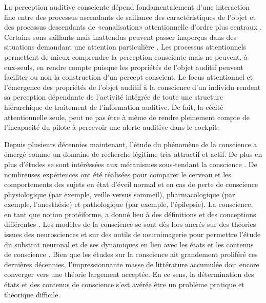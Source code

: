 La perception auditive consciente dépend fondamentalement d'une interaction fine entre des processus ascendants de saillance des caractéristiques de l'objet et des processus descendants de «canalisation» attentionnelle d'ordre plus centraux \citep{elhilali2009interaction}. 
Certains sons saillants mais inattendus peuvent passer inaperçus dans des situations demandant une attention particulière \citep{cherry1953some, koreimann2014inattentional, spence2003speech, vachon2011exploiting, wood1995cocktail}. 
Les processus attentionnels permettent de mieux comprendre la perception consciente mais ne peuvent, à eux-seuls, en rendre compte puisque les propriétés de l'objet auditif peuvent faciliter ou non la construction d'un percept conscient. 
Le focus attentionnel et l'émergence des propriétés de l'objet auditif à la conscience d'un individu rendent sa perception dépendante de l'activité intégrée de toute une structure hiérarchique de traitement de l'information auditive. 
De fait, la cécité attentionnelle seule, peut ne pas être à même de rendre pleinement compte de l'incapacité du pilote à percevoir une alerte auditive dans le cockpit.

Depuis plusieurs décennies maintenant, l'étude du phénomène de la conscience a émergé comme un domaine de recherche légitime très attractif et actif. 
De plus en plus d'études se sont intérêssées aux mécanismes sous-tendant la conscience \citep{cohen2010brain, dehaene2011experimental, khamassi2021neurosciences}. 
De nombreuses expériences ont été réalisées pour comparer le cerveau et les comportements des sujets en état d'éveil normal et en cas de perte de conscience physiologique (par exemple, veille versus sommeil), pharmacologique (par exemple, l'anesthésie) et pathologique (par exemple, l'épilepsie). 
La conscience, en tant que notion protéiforme, a donné lieu à des définitions et des conceptions différentes \citep{dehaene2011experimental, kleiner2020mathematical, sattin2021theoretical, taylor2011review}. 
Les modèles de la conscience se sont dès lors ancrés sur des théories issues des neurosciences et sur des outils de neuroimagerie pour permettre l'étude du substrat neuronal et de ses dynamiques en lien avec les états et les contenus de conscience \citep{aru2012distilling, dehaene2011experimental, khamassi2021neurosciences, kleiner2020mathematical, sattin2021theoretical, tagliazucchi2013sleep, taylor2011review, yaron2021consciousness}. 
Bien que les études sur la conscience ait grandement proliféré ces dernières décennies, l'impressionnante masse de littérature accumulée doit encore converger vers une théorie largement acceptée. 
En ce sens, la détermination des états et des contenus de conscience s'est avérée être un problème pratique et théorique difficile. 

